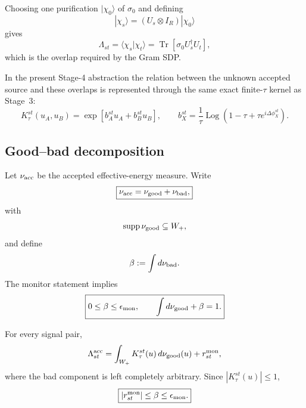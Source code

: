 \documentclass[11pt]{article}
\theoremstyle{remark}
\begin{document}
Choosing one purification \(|\chi_0\rangle\) of \(\sigma_0\) and defining
\[
    |\chi_s\rangle
    =
    (U_s\otimes I_R)|\chi_0\rangle
\]
gives
\begin{equation}
    \Lambda_{st}
    =
    \langle\chi_s|\chi_t\rangle
    =
    \operatorname{Tr}
    [\sigma_0U_s^\dagger U_t],
    \label{eq:stage4-purified-overlap}
\end{equation}
which is the overlap required by the Gram SDP.

In the present Stage-4 abstraction the relation between the unknown accepted
source and these overlaps is represented through the same exact finite-\(\tau\)
kernel as Stage~3:
\begin{equation}
    K_\tau^{st}(u_A,u_B)
    =
    \exp[
      b_A^{st}u_A+b_B^{st}u_B
    ],
    \qquad
    b_X^{st}
    =
    \frac{1}{\tau}
    \operatorname{Log}
    \left(
      1-\tau+\tau e^{i\Delta\phi_X^{st}}
    \right).
    \label{eq:stage4-kernel}
\end{equation}

\subsection{Good--bad decomposition}

Let \(\nu_{\rm acc}\) be the accepted effective-energy measure.  Write
\begin{equation}
    \boxed{
    \nu_{\rm acc}
    =
    \nu_{\rm good}
    +
    \nu_{\rm bad},
    }
    \label{eq:stage4-good-bad}
\end{equation}
with
\[
    \operatorname{supp}\nu_{\rm good}
    \subseteq W_+,
\]
and define
\[
    \beta
    :=
    \int d\nu_{\rm bad}.
\]
The monitor statement implies
\begin{equation}
    \boxed{
    0\le\beta\le\epsilon_{\rm mon},
    \qquad
    \int d\nu_{\rm good}+\beta=1.
    }
    \label{eq:stage4-beta-bound}
\end{equation}

For every signal pair,
\begin{equation}
    \Lambda_{st}^{\rm acc}
    =
    \int_{W_+}
      K_\tau^{st}(u)\,d\nu_{\rm good}(u)
    +
    r_{st}^{\rm mon},
    \label{eq:stage4-overlap-decomposition}
\end{equation}
where the bad component is left completely arbitrary.  Since
\(|K_\tau^{st}(u)|\le1\),
\begin{equation}
    \boxed{
    |r_{st}^{\rm mon}|
    \le
    \beta
    \le
    \epsilon_{\rm mon}.
    }
    \label{eq:stage4-monitor-overlap-slack}
\end{equation}
\end{document}
